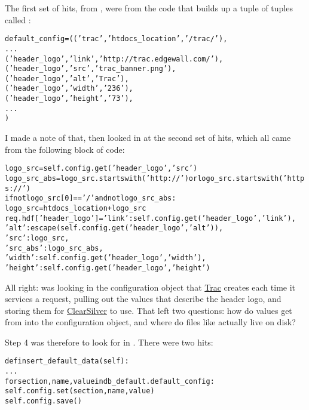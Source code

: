 \documentclass{report}
\begin{document}
The first set of hits, from , were from the code
that builds up a tuple of tuples called :

\begin{alltt}
default_config = (('trac', 'htdocs_location', '/trac/'),
                  ...
                  ('header_logo', 'link', 'http://trac.edgewall.com/'),
                  ('header_logo', 'src', 'trac_banner.png'),
                  ('header_logo', 'alt', 'Trac'),
                  ('header_logo', 'width', '236'),
                  ('header_logo', 'height', '73'),
                  ...
                 )
\end{alltt}

I made a note of that, then looked in  at the second
set of hits, which all came from the following block of code:

\begin{alltt}
logo_src = self.config.get('header_logo', 'src')
logo_src_abs = logo_src.startswith('http://') or logo_src.startswith('https://')
if not logo_src[0] == '/' and not logo_src_abs:
    logo_src = htdocs_location + logo_src
    req.hdf['header_logo'] = { 'link': self.config.get('header_logo', 'link'),
                               'alt': escape(self.config.get('header_logo', 'alt')),
                               'src': logo_src,
                               'src_abs': logo_src_abs,
                               'width': self.config.get('header_logo', 'width'),
                               'height': self.config.get('header_logo', 'height')
                             }
\end{alltt}

All right:  was looking in the configuration object
that \url{Trac} creates each time it services a request, pulling out
the values that describe the header logo, and storing them for
\url{ClearSilver} to use.  That left two questions: how do values get
from  into the configuration object,
and where do files like  actually live on disk?

Step 4 was therefore to look for  in
.  There were two hits:

\begin{alltt}
def insert_default_data(self):
    ...
    for section,name,value in db_default.default_config:
        self.config.set(section, name, value)
    self.config.save()
\end{alltt}
\end{document}

